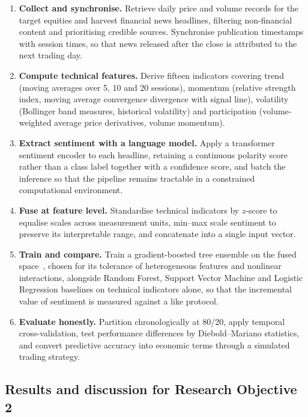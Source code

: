 \begin{enumerate}[label=\textbf{Step \arabic*.},leftmargin=4.2em]
\item \textbf{Collect and synchronise.} Retrieve daily price and volume records for the
target equities and harvest financial news headlines, filtering non-financial content and
prioritising credible sources. Synchronise publication timestamps with session times, so
that news released after the close is attributed to the next trading day.

\item \textbf{Compute technical features.} Derive fifteen indicators covering trend
(moving averages over 5, 10 and 20 sessions), momentum (relative strength index, moving
average convergence divergence with signal line), volatility (Bollinger band measures,
historical volatility) and participation (volume-weighted average price derivatives,
volume momentum).

\item \textbf{Extract sentiment with a language model.} Apply a transformer sentiment
encoder to each headline, retaining a continuous polarity score rather than a class label
together with a confidence score, and batch the inference so that the pipeline remains
tractable in a constrained computational environment.

\item \textbf{Fuse at feature level.} Standardise technical indicators by $z$-score to
equalise scales across measurement units, min--max scale sentiment to preserve its
interpretable range, and concatenate into a single input vector.

\item \textbf{Train and compare.} Train a gradient-boosted tree ensemble on the fused
space~\cite{chen2016xgboost}, chosen for its tolerance of heterogeneous features and
nonlinear interactions, alongside Random Forest, Support Vector Machine and Logistic
Regression baselines on technical indicators alone, so that the incremental value of
sentiment is measured against a like protocol.

\item \textbf{Evaluate honestly.} Partition chronologically at 80/20, apply temporal
cross-validation, test performance differences by Diebold--Mariano statistics, and convert
predictive accuracy into economic terms through a simulated trading strategy.
\end{enumerate}

\subsection{Results and discussion for Research Objective 2}

